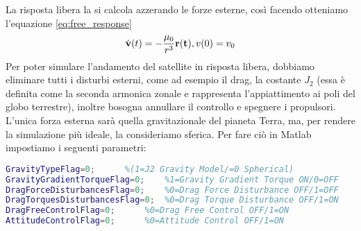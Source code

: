 La risposta libera la si calcola azzerando le forze esterne, così facendo
otteniamo l'equazione \ref{eq:free_response}
\begin{equation}
\dot{\bf v}(t)=-\frac{\mu_0}{r^3}{\bf r(t)}, v(0)=v_0 \nonumber
\end{equation}
Per poter simulare l'andamento del satellite in risposta libera, dobbiamo
eliminare tutti i disturbi esterni, come ad esempio il drag, la costante $J_2$
(essa è definita come la seconda armonica zonale e rappresenta l'appiattimento
ai poli del globo terrestre), inoltre bosogna annullare il controllo e spegnere
i propulsori. L'unica forza esterna sarà quella gravitazionale del pianeta
Terra, ma, per rendere la simulazione più ideale, la consideriamo sferica. Per
fare ciò in Matlab impostiamo i seguenti parametri:
\begin{lstlisting}[language=matlab,breaklines=true]
GravityTypeFlag=0;		%(1=J2 Gravity Model/=0 Spherical)
GravityGradientTorqueFlag=0;	%1=Gravity Gradient Torque ON/0=OFF 
DragForceDisturbancesFlag=0;	%0=Drag Force Disturbance OFF/1=OFF
DragTorquesDisturbancesFlag=0;	%0=Drag Torque Disturbance OFF/1=ON
DragFreeControlFlag=0;		%0=Drag Free Control OFF/1=ON
AttitudeControlFlag=0;		%0=Attitude Control OFF/1=ON
\end{lstlisting}